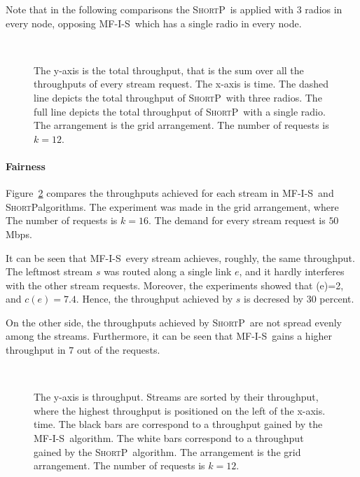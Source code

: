 \documentclass[12pt]{article}
\newenvironment{proof sketch}[1]{\noindent {\emph{Proof sketch of #1:}}}{\hfill \qed}
\newcommand{\MCS}{\text{\sc{mcs}}}
\newcommand{\algA}{\textsc{MF-I-S}}
\newcommand{\algB}{\textsc{ShortP}}
\newcommand{\algS}{\algB}
\begin{document}
Note that in the following comparisons the \algS\ is applied with $3$ radios in every node, opposing \algA\ which has a single radio in every node.

\begin{figure}[h!]
      \centering
        \\
        \caption{The y-axis is the total throughput, that is the sum over all the throughputs of every stream request.  The x-axis is time. The dashed line depicts the total throughput of \algS\ with three radios. The full line depicts the total throughput of \algS\ with a single radio. The arrangement is the grid arrangement. The number of requests is $k=12$. }
      \label{fig:radio13}
     \end{figure}

\paragraph{Fairness}
Figure~\ref{fig:fair} compares the throughputs achieved for each stream in \algA\ and \algS algorithms.
The experiment was made in the grid arrangement, where The number of requests is $k=16$.
The demand for every stream request is $50$ Mbps.

It can be seen that \algA\ every stream achieves, roughly, the same throughput.
The leftmost stream $s$ was routed along a single link $e$, and it hardly interferes with the other stream requests.
Moreover, the experiments showed that \MCS(e)=2, and $c(e)=7.4$. 
Hence, the throughput achieved by $s$ is decresed by $30$ percent.

On the other side, the throughputs achieved by \algS\ are not spread evenly among the streams.
Furthermore, it can be seen that \algA\ gains a higher throughput in  $7$ out of the requests.

\begin{figure}[h!]
      \centering
        \\
        \caption{The y-axis is throughput. Streams are sorted by their throughput, where the highest throughput is positioned on the left of the x-axis. time. The black bars are correspond to a throughput gained by the \algA\ algorithm. The white bars correspond to a throughput gained by the \algS\ algorithm. The arrangement is the grid arrangement. The number of requests is $k=12$. }
      \label{fig:fair}
     \end{figure}
\end{document}
